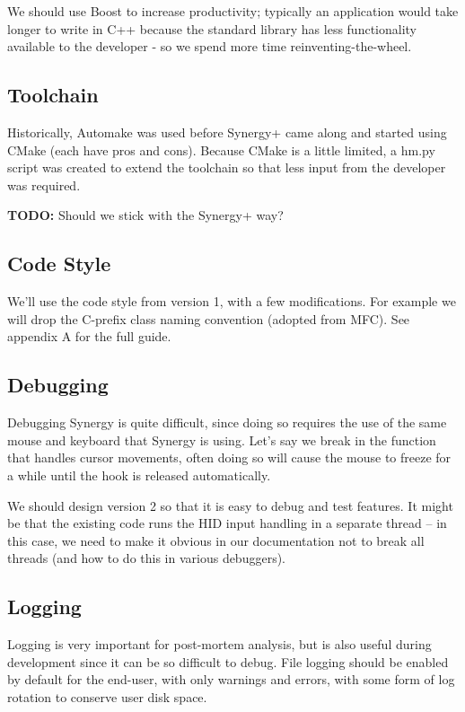\documentclass{article}
\begin{document}
We should use Boost to increase productivity; typically an application would
take longer to write in C++ because the standard library has less functionality
available to the developer - so we spend more time reinventing-the-wheel.

\subsection{Toolchain}

Historically, Automake was used before Synergy+ came along and started using
CMake (each have pros and cons). Because CMake is a little limited, a hm.py 
script was created to extend the toolchain so that less input from the developer
was required.

\textbf{TODO:} Should we stick with the Synergy+ way?

\subsection{Code Style}

We'll use the code style from version 1, with a few modifications. For example 
we will drop the C-prefix class naming convention (adopted from MFC). See 
appendix A for the full guide.

\subsection{Debugging}

Debugging Synergy is quite difficult, since doing so requires the use of the 
same mouse and keyboard that Synergy is using. Let's say we break in the 
function that handles cursor movements, often doing so will cause the mouse
to freeze for a while until the hook is released automatically.

We should design version 2 so that it is easy to debug and test features. It
might be that the existing code runs the HID input handling in a separate 
thread -- in this case, we need to make it obvious in our documentation not to 
break all threads (and how to do this in various debuggers).

\subsection{Logging}

Logging is very important for post-mortem analysis, but is also useful during
development since it can be so difficult to debug. File logging should be 
enabled by default for the end-user, with only warnings and errors, with some
form of log  rotation to conserve user disk space.
\end{document}
